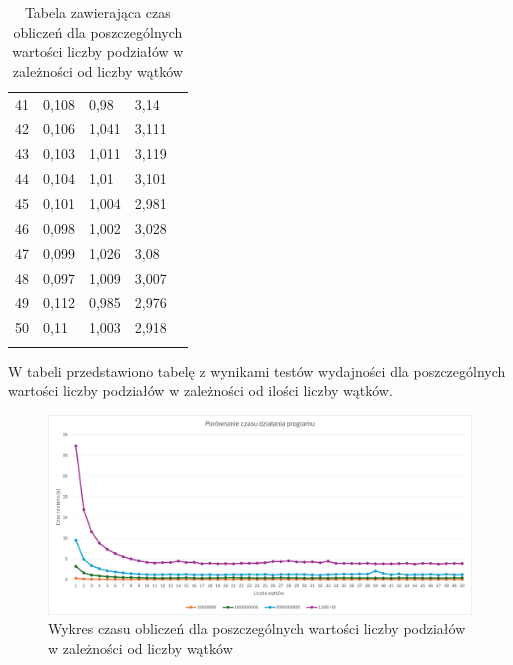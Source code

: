 \begin{longtable}[c]{|c|l|l|l|l}
  41                          & 0,108    & 0,98       & 3,14       & \\ \cline{1-4}
  42                          & 0,106    & 1,041      & 3,111      & \\ \cline{1-4}
  43                          & 0,103    & 1,011      & 3,119      & \\ \cline{1-4}
  44                          & 0,104    & 1,01       & 3,101      & \\ \cline{1-4}
  45                          & 0,101    & 1,004      & 2,981      & \\ \cline{1-4}
  46                          & 0,098    & 1,002      & 3,028      & \\ \cline{1-4}
  47                          & 0,099    & 1,026      & 3,08       & \\ \cline{1-4}
  48                          & 0,097    & 1,009      & 3,007      & \\ \cline{1-4}
  49                          & 0,112    & 0,985      & 2,976      & \\ \cline{1-4}
  50                          & 0,11     & 1,003      & 2,918      & \\ \hline
  \caption{Tabela zawierająca czas obliczeń dla poszczególnych wartości liczby podziałów w zależności od liczby wątków}
  \label{tab:computation_time_table}                                 \\
\end{longtable}

W tabeli  przedstawiono tabelę z wynikami testów wydajności dla poszczególnych wartości liczby podziałów w zależności od ilości liczby wątków.

\newpage

\begin{figure}[!htb]
  \begin{center}
    \includegraphics[width=\linewidth]{rys/computation_time_chart.png}
    \caption{Wykres czasu obliczeń dla poszczególnych wartości liczby podziałów w zależności od liczby wątków}
    \label{rys:computation_time_chart}
  \end{center}
\end{figure}

